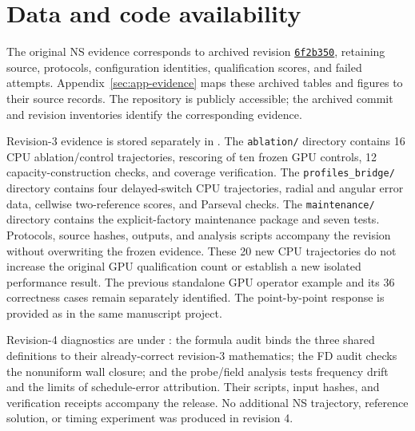 \section*{Data and code availability}

The original NS evidence corresponds to archived revision
\href{https://github.com/LStar404/rfm-navier-stokes-research/tree/6f2b3500964d3d5153b8400018236c4702ef94f8}{\texttt{6f2b350}}, retaining source, protocols, configuration identities, qualification scores, and failed attempts. Appendix~\ref{sec:app-evidence} maps these archived tables and figures to their source records. The repository is publicly accessible; the archived commit and revision inventories identify the corresponding evidence.

Revision-3 evidence is stored separately in . The \texttt{ablation/} directory contains 16 CPU ablation/control trajectories, rescoring of ten frozen GPU controls, 12 capacity-construction checks, and coverage verification. The \texttt{profiles\_bridge/} directory contains four delayed-switch CPU trajectories, radial and angular error data, cellwise two-reference scores, and Parseval checks. The \texttt{maintenance/} directory contains the explicit-factory maintenance package and seven tests. Protocols, source hashes, outputs, and analysis scripts accompany the revision without overwriting the frozen evidence. These 20 new CPU trajectories do not increase the original GPU qualification count or establish a new isolated performance result. The previous standalone GPU operator example and its 36 correctness cases remain separately identified. The point-by-point response is provided as  in the same manuscript project.

Revision-4 diagnostics are under : the formula audit binds the three shared definitions to their already-correct revision-3 mathematics; the FD audit checks the nonuniform wall closure; and the probe/field analysis tests frequency drift and the limits of schedule-error attribution. Their scripts, input hashes, and verification receipts accompany the release. No additional NS trajectory, reference solution, or timing experiment was produced in revision 4.
